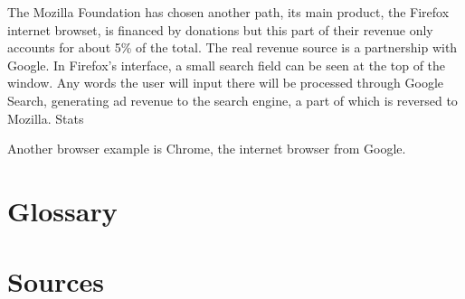 \documentclass[12pt]{article}
\begin{document}
The Mozilla Foundation has chosen another path, its main product, the
Firefox internet browset, is financed by donations but this part of
their revenue only accounts for about 5\% of the total. The real
revenue source is a partnership with Google. In Firefox's interface, a
small search field can be seen at the top of the window. Any words the
user will input there will be processed through Google Search,
generating ad revenue to the search engine, a part of which is
reversed to Mozilla. Stats

Another browser example is Chrome, the internet browser from Google.

\section*{Glossary}

\section*{Sources}



\end{document}

